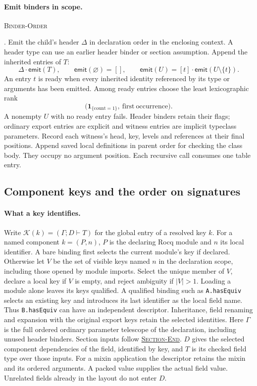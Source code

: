 \documentclass{article}
\newcommand{\ttt}[1]{\texttt{#1}}
\newcommand{\rdefn}[1]{\hypertarget{rule-#1}{\textsc{#1}}}
\newcommand{\ruse}[1]{\hyperlink{rule-#1}{\textsc{#1}}}
\begin{document}
\paragraph{Emit binders in scope.}
\rdefn{Binder-Order}. Emit the child's header $\Delta$ in declaration
order in the enclosing context. A header type can use an earlier header
binder or section assumption. Append the inherited entries of $T$:
\[
  \Delta\cdot\mathsf{emit}(T),\qquad
  \mathsf{emit}(\varnothing)=[],\qquad
  \mathsf{emit}(U)=[t]\cdot\mathsf{emit}(U\setminus\{t\}).
\]
An entry $t$ is ready when every inherited identity referenced by its
type or arguments has been emitted. Among ready entries choose the least
lexicographic rank
\[
  \bigl(\mathbf 1_{\{\mathrm{count}=1\}},\
           \mathrm{first\ occurrence}\bigr).
\]
A nonempty $U$ with no ready entry fails. Header binders retain their
flags; ordinary export entries are explicit and witness entries are
implicit typeclass parameters. Record each witness's head, key, levels
and references at their final positions. Append saved local definitions
in parent order for checking the class body. They occupy no argument
position. Each recursive call consumes one table entry.

\subsection{Component keys and the order on signatures}
\label{sec:key-model}

\paragraph{What a key identifies.}
Write $\mathcal K(k)=(\Gamma;D\vdash T)$ for the global entry of a
resolved key $k$. For a named component $k=(P,n)$, $P$ is the
declaring Rocq module and $n$ its local identifier. A bare binding
first selects the current module's key if declared. Otherwise let $V$ be
the set of visible keys named $n$ in the declaration scope, including
those opened by module imports. Select the unique member of $V$, declare
a local key if $V$ is empty, and reject ambiguity if $|V|>1$.
Loading a module alone leaves its keys qualified. A qualified binding
such as \ttt{A.hasEquiv} selects an existing key and introduces its last
identifier as the local field name. Thus \ttt{B.hasEquiv} can have an
independent descriptor. Inheritance, field renaming and expansion with
the original export keys retain the selected identities. Here $\Gamma$ is the full ordered ordinary parameter
telescope of the declaration, including unused header binders. Section
inputs follow \ruse{Section-End}. $D$ gives the selected component
dependencies of the field, identified by key, and $T$ is its checked
field type over those inputs. For a mixin application the descriptor
retains the mixin and its ordered arguments. A packed value supplies the
actual field value. Unrelated fields already in the layout do not enter
$D$.
\end{document}
